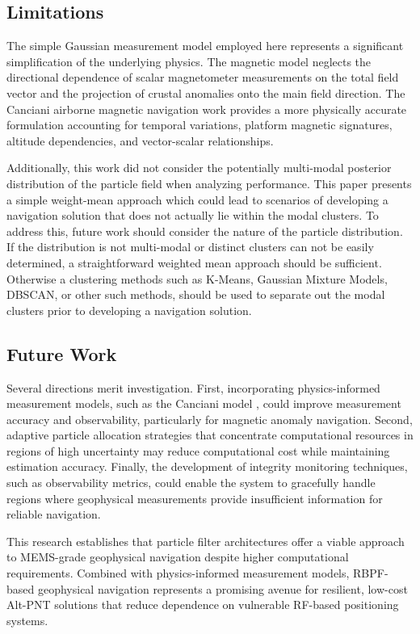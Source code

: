 \documentclass[letterpaper,times]{IONconf}
\begin{document}
\subsection{Limitations}

The simple Gaussian measurement model employed here represents a significant simplification of the underlying physics. The magnetic model neglects the directional dependence of scalar magnetometer measurements on the total field vector and the projection of crustal anomalies onto the main field direction. The Canciani airborne magnetic navigation work \citep{canciani2017airborne} provides a more physically accurate formulation accounting for temporal variations, platform magnetic signatures, altitude dependencies, and vector-scalar relationships. 

Additionally, this work did not consider the potentially multi-modal posterior distribution of the particle field when analyzing performance. This paper presents a simple weight-mean approach which could lead to scenarios of developing a navigation solution that does not actually lie within the modal clusters. To address this, future work should consider the nature of the particle distribution. If the distribution is not multi-modal or distinct clusters can not be easily determined, a straightforward weighted mean approach should be sufficient. Otherwise a clustering methods such as K-Means, Gaussian Mixture Models, DBSCAN, or other such methods, should be used to separate out the modal clusters prior to developing a navigation solution.

\subsection{Future Work}

Several directions merit investigation. First, incorporating physics-informed measurement models, such as the Canciani model \citep{canciani2017airborne}, could improve measurement accuracy and observability, particularly for magnetic anomaly navigation. Second, adaptive particle allocation strategies that concentrate computational resources in regions of high uncertainty may reduce computational cost while maintaining estimation accuracy. Finally, the development of integrity monitoring techniques, such as observability metrics, could enable the system to gracefully handle regions where geophysical measurements provide insufficient information for reliable navigation.

This research establishes that particle filter architectures offer a viable approach to MEMS-grade geophysical navigation despite higher computational requirements. Combined with physics-informed measurement models, RBPF-based geophysical navigation represents a promising avenue for resilient, low-cost Alt-PNT solutions that reduce dependence on vulnerable RF-based positioning systems.
\end{document}
